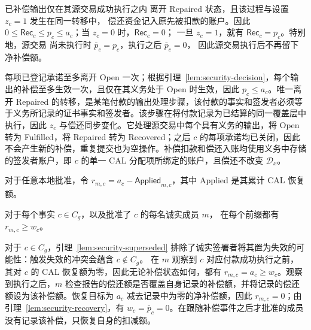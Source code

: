 \begin{lemma}[源交易偿还]
\label{lem:security-recovery}
已补偿输出仅在其源交易成功执行之内
离开 Repaired 状态，且该过程与设置 $z_c=1$ 发生在同一转移中，
偿还资金记入原先被扣款的账户。因此
$0\le\mathsf{Rec}_c\le p_c\le a_c$；当 $z_c=0$ 时，$\mathsf{Rec}_c=0$；
一旦 $z_c=1$，就有 $\mathsf{Rec}_c=p_c$。特别地，源交易
尚未执行时 $\bar p_c=p_c$，执行之后 $\bar p_c=0$，
因此源交易执行后不再留下净补偿额。
\end{lemma}
\begin{IEEEproof}
每项已登记承诺至多离开 Open 一次；根据引理~\ref{lem:security-decision}，每个输出的补偿至多生效一次，且仅在其义务处于 Open 时生效，因此 $p_c\le a_c$。唯一离开 Repaired 的转移，是某笔付款的输出处理步骤，该付款的事实和签发者必须等于义务所记录的证书事实和签发者。该步骤在将付款记录为已结算的同一覆盖层中执行，因此 $z_c$ 与偿还同步变化。它处理源交易中每个具有义务的输出，将 Open 转为 Fulfilled，将 Repaired 转为 Recovered；之后 $c$ 的每项承诺均已关闭，因此不会产生新的补偿，重复提交也为空操作。补偿扣款和偿还入账均使用义务中存储的签发者账户，即 $c$ 的单一 CAL 分配项所绑定的账户，且偿还不改变 $\mathcal D_x$。
\end{IEEEproof}

对于任意本地批准，令 $r_{m,c}=a_c-\mathsf{Applied}_{m,c}$，其中 Applied 是其累计 CAL 恢复额。

\begin{lemma}[残留容量]
\label{lem:security-witness}
对于每个事实 $c\in C_g$，以及批准了 $c$ 的每名诚实成员 $m$，
在每个前缀都有
$r_{m,c}\ge w_c$。
\end{lemma}
\begin{IEEEproof}
对于 $c\in C_g$，引理~\ref{lem:security-superseded} 排除了诚实签署者将其置为失效的可能性：触发失效的冲突会蕴含 $c\notin C_g$。
在 $m$ 观察到 $c$ 对应付款成功执行之前，其对 $c$ 的 CAL 恢复额为零，因此无论补偿状态如何，都有 $r_{m,c}=a_c\ge w_c$。观察到执行之后，$m$ 检查报告的偿还额是否覆盖自身记录的补偿额，并将记录的偿还额设为该补偿额。恢复目标为 $a_c$ 减去记录中为零的净补偿额，因此 $r_{m,c}=0$；由引理~\ref{lem:security-recovery}，有 $w_c=\bar p_c=0$。在跟随补偿事件之后才批准的成员没有记录该补偿，只恢复自身的扣减额。
\end{IEEEproof}

